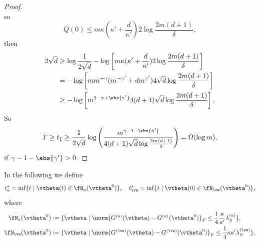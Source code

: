 \documentclass{article}
\begin{document}
\begin{proof}
\begin{equation}
    \end{equation}
    so
    \begin{equation}
        Q(0)\leq m\kappa(\kappa'+\frac{d}{\kappa'})2\log\frac{2m(d+1)}{\delta},
    \end{equation}
    then
    \begin{equation}
        \begin{aligned}
            2\sqrt{d}
             & \geq \log\frac{1}{2\sqrt{d}} - \log\left[m\kappa(\kappa'+\frac{d}{\kappa'})2\log\frac{2m(d+1)}{\delta}\right] \\
             & = -\log\left[mm^{-\gamma}(m^{-\gamma'}+dm^{\gamma'})4\sqrt{d}\log\frac{2m(d+1)}{\delta}\right]                \\
             & \geq - \log\left[m^{1-\gamma+\abs{\gamma'}}4(d+1)\sqrt{d}\log\frac{2m(d+1)}{\delta}\right].
        \end{aligned}
    \end{equation}
    So
    \begin{equation}
        T\geq t_1\geq \frac{1}{2\sqrt{d}}\log\left(\frac{m^{\gamma-1-\abs{\gamma'}}}{4(d+1)\sqrt{d}\log\frac{2m(d+1)}{\delta}}\right) = \Omega(\log m),
    \end{equation}
    if $\gamma-1-\abs{\gamma'}>0$.
\end{proof}
In the following we define
\begin{equation}
    t^*_a=\inf\{t\mid \vtheta(t)\in\fN_a(\vtheta^0)\}, \quad t^*_{\vw}=\inf\{t\mid \vtheta(0)\in\fN_{\vw}(\vtheta^0)\},
\end{equation}
where
\begin{equation}
    \begin{aligned}
        \fN_a(\vtheta^0)     & :=\{\vtheta\mid\norm{G^{(a)}(\vtheta)-G^{(a)}(\vtheta^0)}_F\leq\frac{1}{4}\frac{\kappa}{\kappa'}\lambda_S^{(a)}\}, \\
        \fN_{\vw}(\vtheta^0) & :=\{\vtheta\mid\norm{G^{(\vw)}(\vtheta)-G^{(\vw)}(\vtheta^0)}_F\leq\frac{1}{4}\kappa\kappa'\lambda_S^{(\vw)}\}.
    \end{aligned}
\end{equation}
\end{document}
